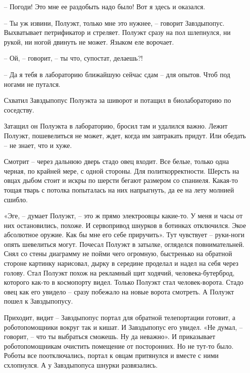 \documentclass[ebook,oneside,final,openright]{memoir}
\begin{document}
– Погоди! Это мне ее раздобыть надо было! Вот я здесь и оказался.\par
– Ты уж извини, Полуэкт, только мне это нужнее, – говорит Завздыпопус. Выхватывает петрификатор и стреляет. Полуэкт сразу на пол шлепнулся, ни рукой, ни ногой двинуть не может. Языком еле ворочает.\par
– Ой, – говорит, – ты что, супостат, делаешь?!\par
– Да я тебя в лабораторию ближайшую сейчас сдам – для опытов. Чтоб под ногами не путался.\par
Схватил Завздыпопус Полуэкта за шиворот и потащил в биолабораторию по соседству.\par
\par
Затащил он Полуэкта в лабораторию, бросил там и удалился важно. Лежит Полуэкт, пошевелиться не может, ждет, когда им завтракать придут. Или обедать – не знает, что и хуже. \par
Смотрит – через дальнюю дверь стадо овец входит. Все белые, только одна черная, по крайней мере, с одной стороны. Для политкорректности. Шерсть на овцах дыбом стоит и искры по шерсти бегают размером со спаниеля. Какая-то тощая тварь с потолка попыталась на них напрыгнуть, да ее на лету молнией сшибло.\par
\par
«Эге, – думает Полуэкт, – это ж прямо электроовцы какие-то. У меня и часы от них остановились, похоже. И сервопривод шнурков в ботинках отключился. Экое абсолютное оружие. Как бы мне его себе приручить». Тут чувствует – руки-ноги опять шевелиться могут. Почесал Полуэкт в затылке, огляделся повнимательней. Снял со стены диаграмму не пойми чего огромную, быстренько на обратной стороне картинку нарисовал, дырку в середине проделал и надел на себя через голову. Стал Полуэкт похож на рекламный щит ходячий, человека-бутерброд, которого как-то в космопорту видел. Только Полуэкт стал человек-ворота. Стадо овец как его увидело – сразу побежало на новые ворота смотреть. А Полуэкт пошел к Завздыпопусу.\par
\par
Приходит, видит – Завздыпопус портал для обратной телепортации готовит, а роботопомощники вокруг так и кишат. И Завздыпопус его увидел. «Не думал, – говорит, – что ты выбраться сможешь. Ну да неважно». И приказывает роботопомощникам очистить помещение от посторонних. Но не тут-то было. Роботы все поотключались, портал к овцам притянулся и вместе с ними схлопнулся. А у Завздыпопуса шнурки развязались.\par
\par
\end{document}
